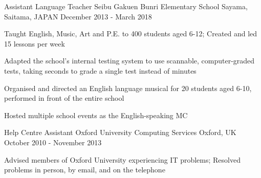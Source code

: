 \begin{cventries}
  \cventry
  {Assistant Language Teacher} %
  {Seibu Gakuen Bunri Elementary School} %
  {Sayama, Saitama, JAPAN} %
  {December 2013 - March 2018} %
  {
    \begin{cvitems} %
      \item {Taught English, Music, Art and P.E. to 400 students aged 6-12; Created and led 15 lessons per week}
      \item {Adapted the school's internal testing system to use scannable, computer-graded tests, taking seconds to grade a single test instead of minutes}
      \item {Organised and directed an English language musical for 20 students aged 6-10, performed in front of the entire school}
      \item {Hosted multiple school events as the English-speaking MC}
    \end{cvitems}
  }

  \cventry
  {Help Centre Assistant} %
  {Oxford University Computing Services} %
  {Oxford, UK} %
  {October 2010 - November 2013} %
  {
    \begin{cvitems} %
      \item {Advised members of Oxford University experiencing IT problems; Resolved problems in person, by email, and on the telephone}
    \end{cvitems}
  }

\end{cventries}
